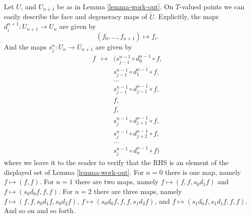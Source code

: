 \begin{remark}
\label{remark-explicit-face-degeneracy}
Let $U$, and $U_{n + 1}$ be as in Lemma \ref{lemma-work-out}.
On $T$-valued points we can easily describe the face
and degeneracy maps of $\tilde U$.
Explicitly, the maps $d^{n + 1}_i : U_{n + 1} \to U_n$
are given by
$$
(f_0, \ldots, f_{n + 1}) \longmapsto f_i.
$$
And the maps $s^n_j : U_n \to U_{n + 1}$ are given by
\begin{eqnarray*}
f & \longmapsto & (
s^{n - 1}_{j - 1} \circ d^{n - 1}_0 \circ f,\\ 
& &
s^{n - 1}_{j - 1} \circ d^{n - 1}_1 \circ f,\\
& &
\ldots\\
& &
s^{n - 1}_{j - 1} \circ d^{n - 1}_{j - 1} \circ f, \\
& &
f,\\
& &
f,\\
& &
s^{n - 1}_j \circ d^{n - 1}_{j + 1} \circ f,\\
& &
s^{n - 1}_j \circ d^{n - 1}_{j + 2} \circ f,\\
& &
\ldots\\
& &
s^{n - 1}_j \circ d^{n - 1}_n \circ f
)
\end{eqnarray*}
where we leave it to the reader to verify that the RHS
is an element of the displayed set of Lemma \ref{lemma-work-out}.
For $n = 0$ there is one map, namely $f \mapsto (f, f)$.
For $n = 1$ there are two maps, namely
$f \mapsto (f, f, s_0d_1f)$ and
$f \mapsto (s_0d_0f, f, f)$.
For $n = 2$ there are three maps, namely
$f \mapsto (f, f, s_0d_1f, s_0d_2f)$,
$f \mapsto (s_0d_0f, f, f, s_1d_2f)$, and
$f \mapsto (s_1d_0f, s_1d_1f, f, f)$.
And so on and so forth.
\end{remark}

